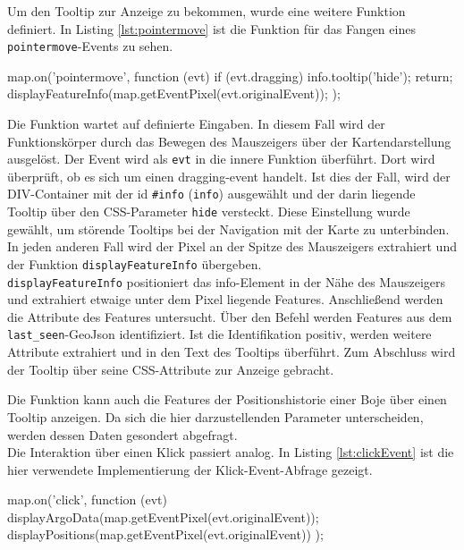 Um den Tooltip zur Anzeige zu bekommen, wurde eine weitere Funktion definiert. In Listing \ref{lst:pointermove} ist die Funktion für das Fangen eines \texttt{pointermove}-Events zu sehen.
\begin{javascript}[label={lst:pointermove}, caption={Das Abfangen eines pointermove-Events}]
map.on('pointermove', function (evt) {
    if (evt.dragging) {
        info.tooltip('hide');
        return;
    }
    displayFeatureInfo(map.getEventPixel(evt.originalEvent));
});
\end{javascript}

Die Funktion wartet auf definierte Eingaben. In diesem Fall wird der Funktionskörper durch das Bewegen des Mauszeigers über der Kartendarstellung ausgelöst. Der Event wird als \texttt{evt} in die innere Funktion überführt. Dort wird überprüft, ob es sich um einen dragging-event handelt. Ist dies der Fall, wird der DIV-Container mit der id \texttt{\#info} (\texttt{info}) ausgewählt und der darin liegende Tooltip über den CSS-Parameter \texttt{hide} versteckt. Diese Einstellung wurde gewählt, um störende Tooltips bei der Navigation mit der Karte zu unterbinden. In jeden anderen Fall wird der Pixel an der Spitze des Mauszeigers extrahiert und der Funktion \texttt{displayFeatureInfo} übergeben.
\\
\texttt{displayFeatureInfo} positioniert das info-Element in der Nähe des Mauszeigers und extrahiert etwaige unter dem Pixel liegende Features. Anschließend werden die Attribute des Features untersucht. Über den Befehl  werden Features aus dem \texttt{last\_seen}-GeoJson identifiziert. Ist die Identifikation positiv, werden weitere Attribute extrahiert und in den Text des Tooltips überführt. Zum Abschluss wird der Tooltip über seine CSS-Attribute zur Anzeige gebracht.

Die Funktion kann auch die Features der Positionshistorie einer Boje über einen Tooltip anzeigen. Da sich die hier darzustellenden Parameter unterscheiden, werden dessen Daten gesondert abgefragt.
\\

Die Interaktion über einen Klick passiert analog. In Listing \ref{lst:clickEvent} ist die hier verwendete Implementierung der Klick-Event-Abfrage gezeigt.
\begin{javascript}[label={lst:clickEvent}, caption={Das Abfangen eines Klick-Events}]
map.on('click', function (evt) {
    displayArgoData(map.getEventPixel(evt.originalEvent));
    displayPositions(map.getEventPixel(evt.originalEvent))
});
\end{javascript}

